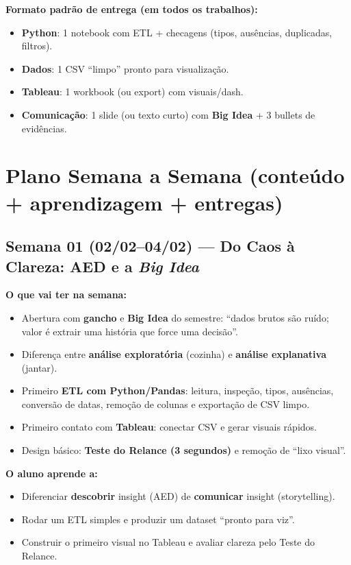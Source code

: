 \begin{NoteBox}
\textbf{Formato padrão de entrega (em todos os trabalhos):}
\begin{itemize}[leftmargin=*]
  \item \textbf{Python}: 1 notebook com ETL + checagens (tipos, ausências, duplicadas, filtros).
  \item \textbf{Dados}: 1 CSV ``limpo'' pronto para visualização.
  \item \textbf{Tableau}: 1 workbook (ou export) com visuais/dash.
  \item \textbf{Comunicação}: 1 slide (ou texto curto) com \textbf{Big Idea} + 3 bullets de evidências.
\end{itemize}
\end{NoteBox}

\section{Plano Semana a Semana (conteúdo + aprendizagem + entregas)}

\subsection*{Semana 01 (02/02--04/02) --- Do Caos à Clareza: AED e a \textit{Big Idea}}
\textbf{O que vai ter na semana:}
\begin{itemize}[leftmargin=*]
  \item Abertura com \textbf{gancho} e \textbf{Big Idea} do semestre: ``dados brutos são ruído; valor é extrair uma história que force uma decisão''.
  \item Diferença entre \textbf{análise exploratória} (cozinha) e \textbf{análise explanativa} (jantar).
  \item Primeiro \textbf{ETL com Python/Pandas}: leitura, inspeção, tipos, ausências, conversão de datas, remoção de colunas e exportação de CSV limpo.
  \item Primeiro contato com \textbf{Tableau}: conectar CSV e gerar visuais rápidos.
  \item Design básico: \textbf{Teste do Relance (3 segundos)} e remoção de ``lixo visual''.
\end{itemize}

\textbf{O aluno aprende a:}
\begin{itemize}[leftmargin=*]
  \item Diferenciar \textbf{descobrir} insight (AED) de \textbf{comunicar} insight (storytelling).
  \item Rodar um ETL simples e produzir um dataset ``pronto para viz''.
  \item Construir o primeiro visual no Tableau e avaliar clareza pelo Teste do Relance.
\end{itemize}

